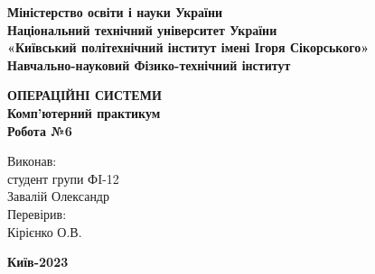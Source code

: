 \documentclass[a4paper,12pt]{article}
\begin{document}
    \pagestyle{fancy}
    \fancyhead{}
    \begin{center}
        \large{\textbf{Міністерство освіти і науки України\\
                Національний технічний університет України\\
                «Київський політехнічний інститут імені Ігоря Сікорського»\\
                Навчально-науковий Фізико-технічний інститут}}\\
        \hfill \break \hfill \break \hfill\break \hfill \break \hfill \break \hfill \break \hfill \break
        \hfill \break \hfill \break \hfill \break
        \begin{center}
            \normalsize{\textbf{ОПЕРАЦІЙНІ СИСТЕМИ\\
            Комп’ютерний практикум\\
            Робота №6}}
        \end{center}
    \end{center}
    \hfill \break \hfill \break \hfill \break \hfill \break \hfill \break \hfill \break \hfill \break
    \hfill \break \hfill \break \hfill \break \hfill \break 
    \begin{flushright}
        \large{ \hspace{35pt} Виконав:\\
            студент групи ФI-12\\
            Завалій Олександр\\} 
        \large{ \hspace{35pt} Перевірив:\\
        Кірієнко О.В.} 
    \end{flushright}
    \hfill \break \hfill \break \hfill \break \hfill \break \hfill \break \hfill \break \hfill \break
    \hfill \break
    \begin{center} \textbf{Київ-2023} \end{center}
    \thispagestyle{empty}
\end{document}
